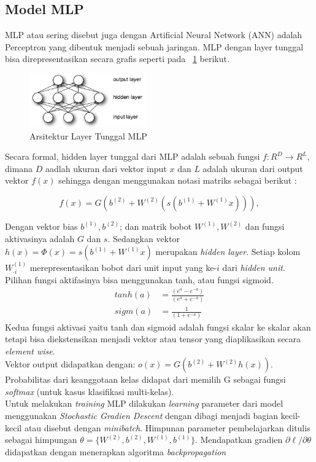 \subsection{Model MLP}

MLP atau sering disebut juga dengan Artificial Neural Network (ANN) adalah Perceptron yang dibentuk menjadi sebuah jaringan. MLP dengan layer tunggal bisa direpresentasikan secara grafis seperti pada  \pic~\ref{fig:mlp} berikut.

\begin{figure}
	\centering
	\includegraphics[width=0.45\textwidth]
		{pics/mlp.png}
	\caption{Arsitektur Layer Tunggal MLP}
	\label{fig:mlp}
\end{figure}

Secara formal, hidden layer tunggal dari MLP adalah sebuah fungsi $f: R^D \rightarrow R^L$, dimana $D$ aadlah ukuran dari vektor input $x$ dan $L$ adalah ukuran dari output vektor $f(x)$ sehingga dengan menggunakan notasi matriks sebagai berikut :

\begin{equation}
f(x) = G( b^{(2)} + W^{(2)}( s( b^{(1)} + W^{(1)} x))),
\end{equation}

Dengan vektor bias $b^{(1)}, b^{(2)}$; dan matrik bobot $W^{(1)}, W^{(2)}$ dan fungsi aktivasinya adalah $G$ dan $s$. Sedangkan vektor $h(x) = \Phi(x) = s(b^{(1)} + W^{(1)} x)$ merupakan \textit{hidden layer}. Setiap kolom $W^{(1)}_{\cdot i}$ merepresentasikan bobot dari unit input yang ke-$i$ dari \textit{hidden unit}. Pilihan fungsi aktifasinya bisa menggunakan tanh, atau fungsi sigmoid.
\begin{equation}
\begin{aligned}
tanh(a)&= \frac{(e^a-e^{-a})}{(e^a+e^{-a})} \\
sigm(a)&=\frac{1}{(1+e^{-a})}
\end{aligned}
\end{equation}
Kedua fungsi aktivasi yaitu tanh dan sigmoid adalah fungsi skalar ke skalar akan tetapi bisa diekstensikan menjadi vektor atau tensor yang diaplikasikan secara \textit{element wise}.\\
Vektor output didapatkan dengan: $o(x) = G(b^{(2)} + W^{(2)} h(x))$. Probabilitas dari keanggotaan kelas didapat dari memilih G sebagai fungsi \textit{softmax} (untuk kasus klasifikasi multi-kelas).\\
Untuk melakukan \textit{training} MLP dilakukan \textit{learning} parameter dari model menggunakan \textit{Stochastic Gradien Descent} dengan dibagi menjadi bagian kecil-kecil atau disebut dengan \textit{minibatch}. Himpunan parameter pembelajarkan ditulis sebagai himpungan $\theta = \{W^{(2)},b^{(2)},W^{(1)},b^{(1)}\}$. Mendapatkan gradien $\partial{\ell}/\partial{\theta}$ didapatkan dengan menerapkan algoritma \textit{backpropagation} \citep{tutorial2014lisa}


